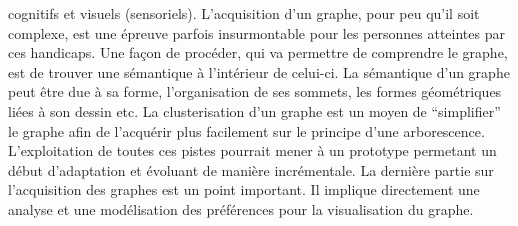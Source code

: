 \documentclass[french,a4paper]{report}
\begin{document}
{cognitifs et visuels (sensoriels). L'acquisition d'un graphe, pour peu qu'il soit
complexe, est une épreuve parfois insurmontable pour les personnes atteintes par
ces handicaps. Une façon de procéder, qui va permettre de comprendre le graphe,
est de trouver une sémantique à l'intérieur de celui-ci. La sémantique d'un
graphe peut être due à sa forme, l'organisation de ses sommets, les formes
géométriques liées à son dessin etc. La clusterisation d'un graphe est un
moyen de \enquote{simplifier} le graphe afin de l'acquérir plus facilement sur le
principe d'une arborescence.\\
L'exploitation de toutes ces pistes pourrait mener à un prototype permetant un début
d'adaptation et évoluant de manière incrémentale. La dernière partie sur l'acquisition des
graphes est un point important. Il implique directement une analyse et une modélisation
des préférences pour la visualisation du graphe.
\newpage


\newpage
}
\end{document}
